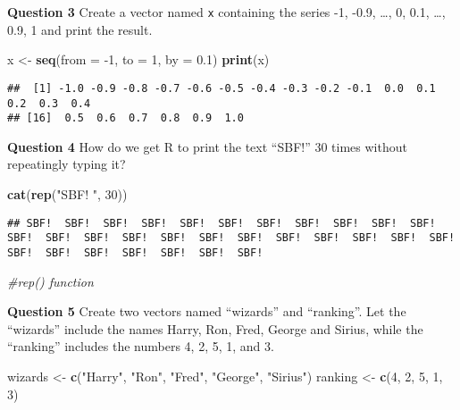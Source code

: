 \documentclass[
]{article}
\newenvironment{Shaded}{\begin{snugshade}}{\end{snugshade}}
\newcommand{\CommentTok}[1]{\textcolor[rgb]{0.56,0.35,0.01}{\textit{#1}}}
\newcommand{\DataTypeTok}[1]{\textcolor[rgb]{0.13,0.29,0.53}{#1}}
\newcommand{\DecValTok}[1]{\textcolor[rgb]{0.00,0.00,0.81}{#1}}
\newcommand{\FloatTok}[1]{\textcolor[rgb]{0.00,0.00,0.81}{#1}}
\newcommand{\KeywordTok}[1]{\textcolor[rgb]{0.13,0.29,0.53}{\textbf{#1}}}
\newcommand{\NormalTok}[1]{#1}
\newcommand{\StringTok}[1]{\textcolor[rgb]{0.31,0.60,0.02}{#1}}
\begin{document}
\textbf{Question 3} Create a vector named \texttt{x} containing the
series -1, -0.9, \ldots, 0, 0.1, \ldots, 0.9, 1 and print the result.

\begin{Shaded}
\begin{Highlighting}[]
\NormalTok{x <-}\StringTok{ }\KeywordTok{seq}\NormalTok{(}\DataTypeTok{from =} \DecValTok{-1}\NormalTok{, }\DataTypeTok{to =} \DecValTok{1}\NormalTok{, }\DataTypeTok{by =} \FloatTok{0.1}\NormalTok{)}
\KeywordTok{print}\NormalTok{(x)}
\end{Highlighting}
\end{Shaded}

\begin{verbatim}
##  [1] -1.0 -0.9 -0.8 -0.7 -0.6 -0.5 -0.4 -0.3 -0.2 -0.1  0.0  0.1  0.2  0.3  0.4
## [16]  0.5  0.6  0.7  0.8  0.9  1.0
\end{verbatim}

\textbf{Question 4} How do we get R to print the text ``SBF!'' 30 times
without repeatingly typing it?

\begin{Shaded}
\begin{Highlighting}[]
\KeywordTok{cat}\NormalTok{(}\KeywordTok{rep}\NormalTok{(}\StringTok{"SBF! "}\NormalTok{, }\DecValTok{30}\NormalTok{))}
\end{Highlighting}
\end{Shaded}

\begin{verbatim}
## SBF!  SBF!  SBF!  SBF!  SBF!  SBF!  SBF!  SBF!  SBF!  SBF!  SBF!  SBF!  SBF!  SBF!  SBF!  SBF!  SBF!  SBF!  SBF!  SBF!  SBF!  SBF!  SBF!  SBF!  SBF!  SBF!  SBF!  SBF!  SBF!  SBF!
\end{verbatim}

\begin{Shaded}
\begin{Highlighting}[]
\CommentTok{#rep() function }
\end{Highlighting}
\end{Shaded}

\textbf{Question 5} Create two vectors named ``wizards'' and
``ranking''. Let the ``wizards'' include the names Harry, Ron, Fred,
George and Sirius, while the ``ranking'' includes the numbers 4, 2, 5,
1, and 3.

\begin{Shaded}
\begin{Highlighting}[]
\NormalTok{wizards <-}\StringTok{ }\KeywordTok{c}\NormalTok{(}\StringTok{"Harry"}\NormalTok{, }\StringTok{"Ron"}\NormalTok{, }\StringTok{"Fred"}\NormalTok{, }\StringTok{"George"}\NormalTok{, }\StringTok{"Sirius"}\NormalTok{)}
\NormalTok{ranking <-}\StringTok{ }\KeywordTok{c}\NormalTok{(}\DecValTok{4}\NormalTok{, }\DecValTok{2}\NormalTok{, }\DecValTok{5}\NormalTok{, }\DecValTok{1}\NormalTok{, }\DecValTok{3}\NormalTok{)}
\end{Highlighting}
\end{Shaded}
\end{document}
